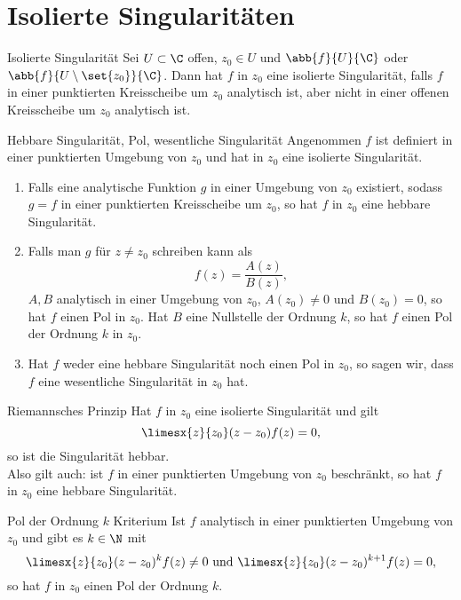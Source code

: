 \section{Isolierte Singularitäten}

\begin{karte}{Isolierte Singularität}
    Sei \(U\subset \C\) offen, \(z_0 \in U\) und \(\abb{f}{U}{\C}\) oder 
    \(\abb{f}{U\setminus \set{z_0}}{\C}\). Dann hat \(f\) in \(z_0\) 
    eine isolierte Singularität, falls \(f\) in einer punktierten Kreisscheibe 
    um \(z_0\) analytisch ist, aber nicht in einer offenen Kreisscheibe um 
    \(z_0\) analytisch ist.
\end{karte}

\begin{karte}{Hebbare Singularität, Pol, wesentliche Singularität}
    Angenommen \(f\) ist definiert in einer punktierten Umgebung von \(z_0\) 
    und hat in \(z_0\) eine isolierte Singularität. 
    \begin{enumerate}
        \item Falls eine analytische Funktion \(g\) in einer Umgebung 
        von \(z_0\) existiert, sodass \(g = f\) in einer punktierten 
        Kreisscheibe um \(z_0\), so hat \(f\) in \(z_0\) eine hebbare Singularität.
        \item Falls man \(g\) für \(z\neq z_0\) schreiben kann als 
        \[ f(z) = \frac{A(z)}{B(z)}, \]
        \(A,B\) analytisch in einer Umgebung von \(z_0\), 
        \(A(z_0) \neq 0\) und \(B(z_0) = 0\), so hat \(f\) 
        einen Pol in \(z_0\). Hat \(B\) eine Nullstelle der Ordnung \(k\), 
        so hat \(f\) einen Pol der Ordnung \(k\) in \(z_0\).
        \item Hat \(f\) weder eine hebbare Singularität noch einen Pol 
        in \(z_0\), so sagen wir, dass \(f\) eine wesentliche Singularität 
        in \(z_0\) hat.
    \end{enumerate}
\end{karte}

\begin{karte}{Riemannsches Prinzip}
    Hat \(f\) in \(z_0\) eine isolierte Singularität und gilt 
    \[ \limesx{z}{z_0} (z - z_0) f(z) = 0, \]
    so ist die Singularität hebbar.\\
    Also gilt auch: ist \(f\) in einer punktierten Umgebung 
    von \(z_0\) beschränkt, so hat \(f\) in \(z_0\) eine hebbare 
    Singularität.
\end{karte}

\begin{karte}{Pol der Ordnung \(k\) Kriterium}
    Ist \(f\) analytisch in einer punktierten Umgebung von \(z_0\) 
    und gibt es \(k\in \N\) mit 
    \[ \limesx{z}{z_0} (z - z_0)^k f(z) \neq 0 \text{ und } 
    \limesx{z}{z_0} (z - z_0)^{k+1} f(z) = 0, \]
    so hat \(f\) in \(z_0\) einen Pol der Ordnung \(k\).
\end{karte}

